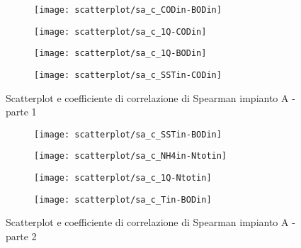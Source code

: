 \begin{sidewaysfigure}[h]
	\renewcommand*\thesubfigure{(\arabic{subfigure})}
	\begin{subfigure}{0.49\textwidth}
		\texttt{[image: scatterplot/sa\_c\_CODin-BODin]}
		\caption{}
		\centering
	\end{subfigure}
	\begin{subfigure}{0.49\textwidth}
		\texttt{[image: scatterplot/sa\_c\_1Q-CODin]}
		\caption{}
		\centering
	\end{subfigure}

	\begin{subfigure}{0.49\textwidth}
		\texttt{[image: scatterplot/sa\_c\_1Q-BODin]}
		\caption{}
		\centering
	\end{subfigure}
	\begin{subfigure}{0.49\textwidth}
		\texttt{[image: scatterplot/sa\_c\_SSTin-CODin]}	
		\caption{}
		\centering
	\end{subfigure}
	\caption{Scatterplot e coefficiente di correlazione di Spearman impianto A - parte 1}
	\label{fig:sa_corr4}
\end{sidewaysfigure}

\begin{sidewaysfigure}[h]\ContinuedFloat
	\renewcommand*\thesubfigure{(\arabic{subfigure})}
	\begin{subfigure}{0.49\textwidth}
		\texttt{[image: scatterplot/sa\_c\_SSTin-BODin]}
		\caption{}
		\centering
	\end{subfigure}
	\begin{subfigure}{0.49\textwidth}
		\texttt{[image: scatterplot/sa\_c\_NH4in-Ntotin]}
		\caption{}
		\centering
	\end{subfigure}

	\begin{subfigure}{0.49\textwidth}
		\texttt{[image: scatterplot/sa\_c\_1Q-Ntotin]}
		\caption{}
		\centering
	\end{subfigure}
	\begin{subfigure}{0.49\textwidth}
		\texttt{[image: scatterplot/sa\_c\_Tin-BODin]}	
		\caption{}
		\centering
	\end{subfigure}
	\caption{Scatterplot e coefficiente di correlazione di Spearman impianto A - parte 2}
\end{sidewaysfigure}

